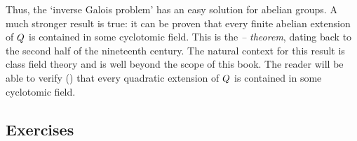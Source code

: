 Thus, the `inverse Galois problem' has an easy solution for abelian
groups. A much stronger result is true: it can be proven that every
finite abelian extension of $Q$ is contained in some cyclotomic
field.  This is the \emph{-- theorem},
dating back to the second half of the nineteenth century. The natural
context for this result is class field theory and is well beyond the
scope of this book. The reader will be able to verify
() that
every quadratic extension of $Q$ is contained in some cyclotomic
field.

\subsection*{Exercises}

